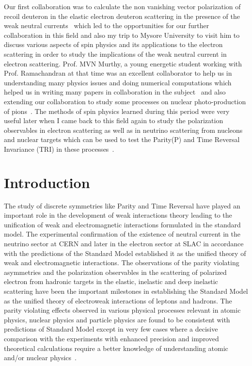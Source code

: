    Our first collaboration was to calculate the  non vanishing vector polarization of recoil deuteron in the elastic electron  deuteron   scattering in the presence of the weak neutral currents~\cite{Ramachandran:1978zz} which led to the opportunities for our further collaboration in this field and also my trip to Mysore University  to visit him to discuss various aspects of spin physics and its applications to the electron scattering in order to study the implications of the weak neutral current  in electron scattering. Prof. MVN Murthy, a young energetic student working with Prof. Ramachandran at that time was an excellent collaborator to help us in understanding many physics issues and doing numerical computations which helped us in writing many papers in collaboration in the subject~\cite{Murthy:1979ws,Singh:1980xi,Murthy:1983wt} and also extending our collaboration to study some processes on nuclear  photo-production of pions~\cite{Murthy:1982fe}. The methods of spin physics learned during this period were very useful later when I came back to this field again to study the polarization observables in electron scattering as well as in neutrino scattering from nucleons and nuclear targets which can be used to test the Parity(P) and Time Reversal Invariance (TRI) in these processes~\cite{Arenhovel:2000if,Ahmad:2008zs,Akbar:2017qsf,Fatima:2018gjy,Fatima:2018tzs}.
  \section{Introduction}
   The study of discrete symmetries like Parity and Time Reversal have played an important role in the development of weak interactions theory leading to the unification of weak and electromagnetic interactions formulated in the standard model. The experimental confirmation of the existence of neutral current in the neutrino sector at CERN and later in the electron sector at SLAC in accordance with the predictions of the Standard Model  established it as the unified theory of weak and electromagnetic interactions.  The observations of the parity violating  asymmetries and the polarization observables in the scattering of polarized electron from  hadronic targets in the elastic,  inelastic and deep inelastic  scattering have been the important   milestones in establishing the Standard Model  as the unified theory of electroweak interactions  of  leptons and hadrons.  The parity violating effects observed in various physical processes relevant in atomic physics,  nuclear physics and particle physics are found to be consistent with  predictions of Standard Model except in very few cases where a decisive comparison with the experiments with  enhanced  precision and improved theoretical calculations require a better knowledge of  understanding atomic and/or nuclear physics~\cite{Athar:1970esm}.
   
